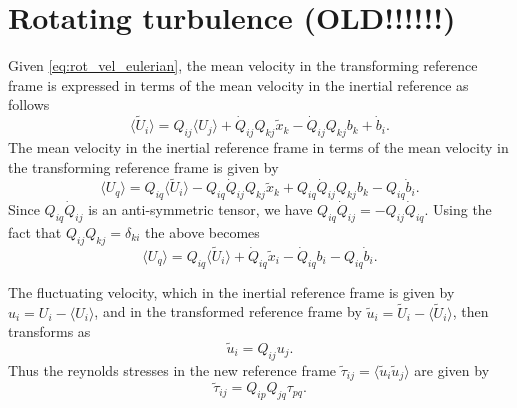 \documentclass[oneside,a4paper,11pt]{report}
\newcommand{\rs}{\tau}          %
\newcommand{\uiavg}{\langle U_i \rangle}
\newcommand{\uifluc}{u_i}
\begin{document}
\section{Rotating turbulence (OLD!!!!!!)}
Given \cref{eq:rot_vel_eulerian}, the mean velocity in the transforming reference frame is expressed in terms of the mean velocity in the inertial reference as follows
\begin{equation}
\label{rot_mean_vel}
\langle \tilde{U}_i \rangle = Q_{ij} \langle U_j \rangle + \dot{Q}_{ij} Q_{kj} \tilde{x}_k - \dot{Q}_{ij} Q_{kj} b_k + \dot{b}_i.
\end{equation}
The mean velocity in the inertial reference frame in terms of the mean velocity in the transforming reference frame is given by
\begin{equation}
\langle U_q \rangle = Q_{iq} \langle \tilde{U}_i \rangle  - Q_{iq}\dot{Q}_{ij} Q_{kj} \tilde{x}_k + Q_{iq}\dot{Q}_{ij} Q_{kj} b_k - Q_{iq} \dot{b}_i.
\end{equation}
Since $Q_{iq}\dot{Q}_{ij}$ is an anti-symmetric tensor, we have $Q_{iq}\dot{Q}_{ij} = -Q_{ij}\dot{Q}_{iq}$. Using the fact that $Q_{ij}Q_{kj} = \delta_{ki}$ the above becomes
\begin{equation}
\langle U_q \rangle = Q_{iq} \langle \tilde{U}_i \rangle + \dot{Q}_{iq} \tilde{x}_i -  \dot{Q}_{iq}b_i - Q_{iq} \dot{b}_i.
\end{equation}

The fluctuating velocity, which in the inertial reference frame is given by $\uifluc = U_i - \uiavg$, and in the transformed reference frame by $\tilde{u}_i = \tilde{U}_i - \langle \tilde{U}_i \rangle$, then transforms as
\begin{equation}
\tilde{u}_i = Q_{ij} u_j .
\end{equation}
Thus the reynolds stresses in the new reference frame $\tilde{\rs}_{ij} = \langle \tilde{u}_i \tilde{u}_j \rangle$ are given by 
\begin{equation}
\tilde{\rs}_{ij} = Q_{ip}Q_{jq} \rs_{pq}.
\end{equation}
\end{document}
